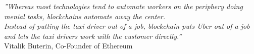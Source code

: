 

\cleardoublepage
\thispagestyle{plain}

\vspace*{6cm}

\begin{flushright}
   \textsl{''Whereas most technologies tend to automate workers on the periphery doing menial tasks, blockchains automate away the center. \\
           Instead of putting the taxi driver out of a job, blockchain puts Uber out of a job and lets the taxi drivers work with the customer directly.''} \\
\vspace*{1.5cm}
           Vitalik Buterin, Co-Founder of Ethereum
\end{flushright}


\vspace*{2cm}

\begin{comment}

\begin{flushright}
   \textsl{''The blockchain symbolizes a shift in power from the centers \\ to the edges of the networks.''} \\
\vspace*{1.5cm}
           William Mougayar, Chair, Kin Foundation
\end{flushright}

\vspace*{2cm}

\begin{flushright}
   \textsl{''Online identity and reputation will be decentralized. \\We will own the data that belongs to us.''} \\
\vspace*{1.5cm}
           William Mougayar, Chair, Kin Foundation
\end{flushright}

\end{comment}

